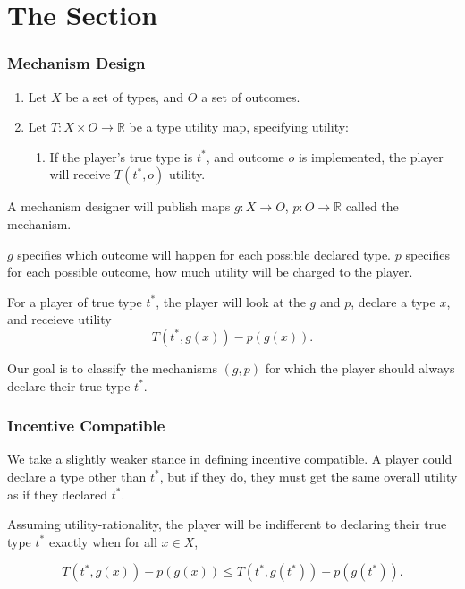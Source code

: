 \section{The Section}

\begin{frame}
  \frametitle{Mechanism Design}

        \begin{enumerate}
  \item Let $X$ be a set of types, and $O$ a set of outcomes. 
        
        \item Let $T : X \times O \to \mathbb R$ be 
  a type utility map, specifying utility: 
                        \begin{enumerate} \item If the player's true type is $t^*$, and outcome 
                        $o$ is implemented, the player will receive $T(t^*, o)$ utility.
                        \end{enumerate}
        \end{enumerate}

  A mechanism designer will publish maps $g : X \to O$, $p : O \to \mathbb R$
        called the mechanism.

  $g$ specifies which outcome will happen for each possible declared type. 
  $p$ specifies for each possible outcome, how much utility will be charged to the player.
        
  For a player of true type $t^*$, the player will look at the $g$ and $p$, declare a type $x$, 
        and receieve utility $$ T(t^*, g(x)) - p(g(x)).$$

        Our goal is to classify the mechanisms $(g,p)$ for which the player should always
        declare their true type $t^*$.
\end{frame}

\begin{frame}
        \frametitle{Incentive Compatible}
        We take a slightly weaker stance in defining incentive compatible.
        A player could declare a type other than $t^*$, but
        if they do, they must get the same overall utility as if they declared $t^*$.

        Assuming utility-rationality, the player will be indifferent to declaring their true type 
        $t^*$ exactly when for all $x \in X$,

        $$T(t^*, g(x)) - p(g(x)) \le T(t^*, g(t^*)) - p(g(t^*)).$$
\end{frame}

